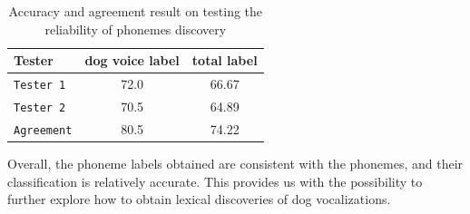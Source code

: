 

\begin{table}[th]
\centering
\small
\begin{tabular}{lcc}
\hline
\textbf{Tester} & \textbf{dog voice label} & \textbf{total label}\\
\hline
\verb|Tester 1| & 72.0 & 66.67 \\
\verb|Tester 2| & 70.5 & 64.89 \\
\verb|Agreement| & 80.5 & 74.22 \\\hline
\end{tabular}
\caption{Accuracy and agreement result on testing the reliability of phonemes discovery}
\label{tab:phonetestresult}
\end{table}



Overall, the phoneme labels obtained are consistent with the phonemes, 
and their classification is relatively accurate. This provides us with the 
possibility to further explore how to obtain lexical discoveries of 
dog vocalizations.



